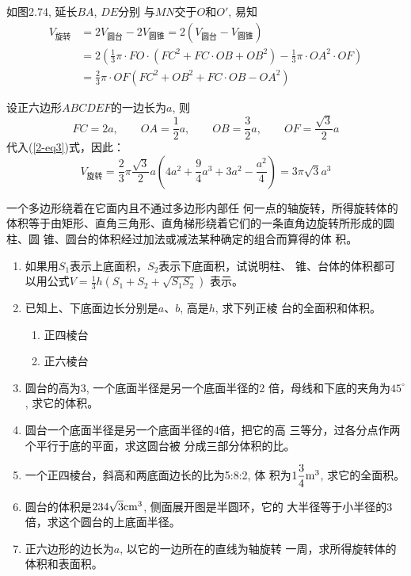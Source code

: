 \begin{solution}
如图2.74, 延长$BA$, $DE$分别
与$MN$交于$O$和$O'$, 易知
\begin{equation}\label{2-eq3}
\begin{split}
    V_{\text{旋转}}&=2V_{\text{圆台}}-2V_{\text{圆锥}}=2\left(V_{\text{圆台}}-V_{\text{圆锥}}\right)\\
    &=2\left(\frac{1}{3}\pi\cdot FO\cdot (FC^2+FC\cdot OB+OB^2)-\frac{1}{3}\pi \cdot OA^2 \cdot OF\right)\\
    &=\frac{2}{3}\pi \cdot OF (FC^2+OB^2+FC\cdot OB-OA^2)
\end{split}
\end{equation}

设正六边形$ABCDEF$的一边长为$a$, 
则
\[FC=2a,\qquad OA=\frac{1}{2}a,\qquad OB=\frac{3}{2}a,\qquad OF=\frac{\sqrt{3}}{2}a\]
代入(\ref{2-eq3})式，因此：
\[V_{\text{旋转}}=\frac{2}{3}\pi \frac{\sqrt{3}}{2}a\left(4a^2+\frac{9}{4}a^3+3a^2-\frac{a^2}{4}\right)
=3\pi \sqrt{3}a^3\]
\end{solution}


\begin{rmk}
    一个多边形绕着在它面内且不通过多边形内部任
何一点的轴旋转，所得旋转体的体积等于由矩形、直角三角形、直角梯形绕着它们的一条直角边旋转所形成的圆柱、圆
锥、圆台的体积经过加法或减法某种确定的组合而算得的体
积。
\end{rmk}

\begin{ex}
\begin{enumerate}
    \item 如果用$S_1$表示上底面积，$S_2$表示下底面积，试说明柱、
    锥、台体的体积都可以用公式$V=\frac{1}{3}h\left(S_1+S_2+\sqrt{S_1S_2}\right)$
    表示。
    \item 
    已知上、下底面边长分别是$a$、$b$, 高是$h$, 求下列正棱
    台的全面积和体积。
\begin{multicols}{2}
\begin{enumerate}
    \item 正四棱台
    \item 正六棱台
\end{enumerate}
\end{multicols}
    \item 圆台的高为3, 一个底面半径是另一个底面半径的2
    倍，母线和下底的夹角为$45^{\circ}$, 求它的体积。
    \item 圆台一个底面半径是另一个底面半径的4倍，把它的高
    三等分，过各分点作两个平行于底的平面，求这圆台被
    分成三部分体积的比。
    \item 一个正四棱台，斜高和两底面边长的比为5:8:2, 体
    积为$1\frac{3}{4}{\rm m^3}$, 求它的全面积。
    \item 
    圆台的体积是$234\sqrt{3}{\rm cm^3}$, 侧面展开图是半圆环，它的
    大半径等于小半径的3倍，求这个圆台的上底面半径。
    \item 
    正六边形的边长为$a$, 以它的一边所在的直线为轴旋转
    一周，求所得旋转体的体积和表面积。
\end{enumerate}
\end{ex}

